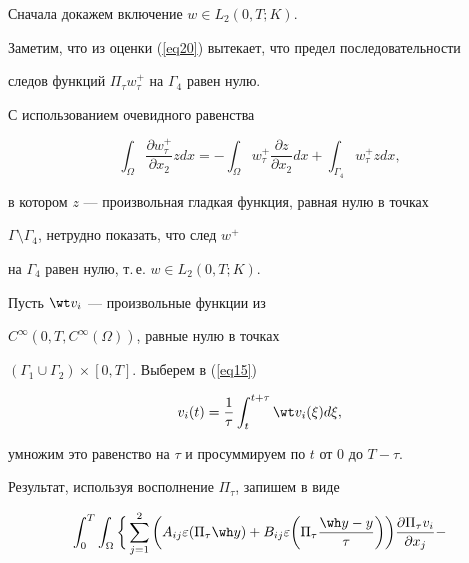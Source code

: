 \begin{pf}


Сначала докажем включение $w \in L_{2}(0,T;K)$.


Заметим, что из оценки (\ref{eq20}) вытекает, что предел последовательности


следов функций $\Pi_{\tau} w_{\tau}^{+}$ на $\Gamma_{4}$ равен нулю.


С использованием очевидного равенства


$$


\int_{\Omega} \frac{\partial w_{\tau}^{+}}{\partial x_{2}} z dx =


- \int_{\Omega} w_{\tau}^{+} \frac{\partial z}{\partial x_{2}} dx +


\int_{\Gamma_{4}} w_{\tau}^{+} z dx,


$$


в котором $z$ --- произвольная гладкая функция, равная нулю в точках


$\Gamma \setminus \Gamma_{4}$, нетрудно показать, что след $w^{+}$


на $\Gamma_{4}$ равен нулю, т.\,е.{} $w \in L_{2}(0,T;K)$.





Пусть $\wt v_{i}$ --- произвольные функции из


$C^{\infty}(0,T,C^{\infty}(\Omega))$, равные нулю в точках


$(\Gamma_{1} \cup \Gamma_{2}) \times [0,T]$. Выберем в (\ref{eq15})


$$


v_{i}(t) = \frac{1}{\tau} \int_{t}^{t+ \tau} 


\wt v_{i}(\xi) d \xi ,


$$


умножим это равенство на $ \tau$ и просуммируем по $t$ от 0 до $T- \tau$.


Результат, используя восполнение $ \Pi_{\tau}$, запишем в виде


\begin{multline}


\label{eq35}


\int_{0}^{T} \int_{\Omega} \bigg\{\sum 


_{j=1}^{2} \bigg (A_{ij} \varepsilon (\Pi_{\tau} \wh y


) + B_{ij} \varepsilon \bigg(\Pi_{\tau} \frac


{\wh y - y}{\tau} \bigg) \bigg) \frac{\partial \Pi_{\tau} 


v_{i}}{\partial x_{j}} - 



\end{multline}
\end{pf}
